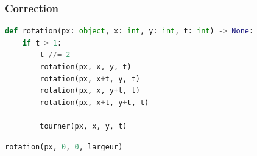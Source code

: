 \documentclass[svgnames,11pt]{beamer}
\begin{document}
\begin{frame}[fragile]
    \frametitle{Correction}

    \begin{center}
    \begin{lstlisting}[language=Python , basicstyle=\ttfamily\small, xleftmargin=2em, xrightmargin=2em]
def rotation(px: object, x: int, y: int, t: int) -> None:
    if t > 1:
        t //= 2
        rotation(px, x, y, t)
        rotation(px, x+t, y, t)
        rotation(px, x, y+t, t)
        rotation(px, x+t, y+t, t)

        tourner(px, x, y, t) 
\end{lstlisting}
    \label{CODE}
    \end{center}
\begin{center}
\begin{lstlisting}[language=Python , basicstyle=\ttfamily\small, xleftmargin=2em, xrightmargin=2em]
rotation(px, 0, 0, largeur)
\end{lstlisting}
\label{CODE}
\end{center}
\end{frame}
\end{document}
